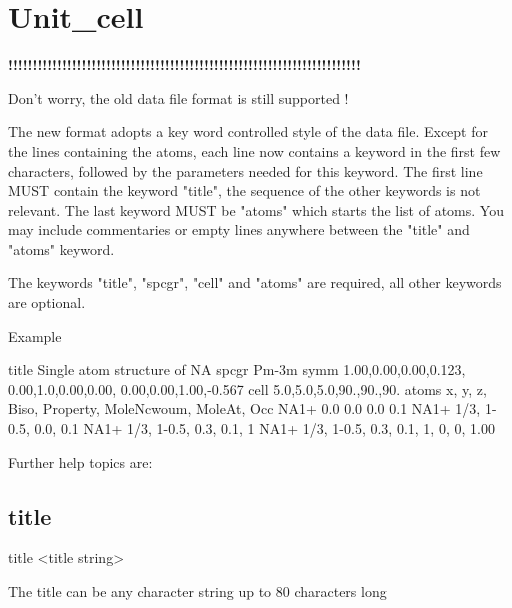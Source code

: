 \section{Unit\_cell}
{\bf !!!!!!!!!!!!!!!!!!!!!!!!!!!!!!!!!!!!!!!!!!!!!!!!!!!!!!!!!!!!!!!!!!!!!!!! \par }
\par
\vspace{3pt}
Don't worry, the old data file format is still supported ! 
\par
The new format adopts a key word controlled style of the data file. 
Except for the lines containing the atoms, each line now contains a 
keyword in the first few characters, followed by the parameters needed 
for this keyword. 
The first line MUST contain the keyword "title", the sequence of the 
other keywords is not relevant. 
The last keyword MUST be "atoms" which starts the list of atoms. 
You may include commentaries or empty lines anywhere between the 
"title" and "atoms" keyword. 
\par
The keywords "title", "spcgr", "cell" and "atoms" are required, all 
other keywords are optional. 
\par
Example 
\par
\begin{MacVerbatim}
title Single atom structure of NA
spcgr Pm-3m
symm  1.00,0.00,0.00,0.123, 0.00,1.0,0.00,0.00, 0.00,0.00,1.00,-0.567
cell  5.0,5.0,5.0,90.,90.,90.
atoms x,    y,    z,  Biso, Property, MoleNcwoum, MoleAt, Occ
NA1+  0.0   0.0   0.0 0.1
NA1+  1/3, 1-0.5, 0.0, 0.1
NA1+  1/3, 1-0.5, 0.3, 0.1,  1
NA1+  1/3, 1-0.5, 0.3, 0.1,  1,  0,  0,   1.00
\end{MacVerbatim}
Further help topics are: 
\par
\subsection*{title}
\begin{MacVerbatim}
title <title string>
\end{MacVerbatim}
The title can be any character string up to 80 characters long 
